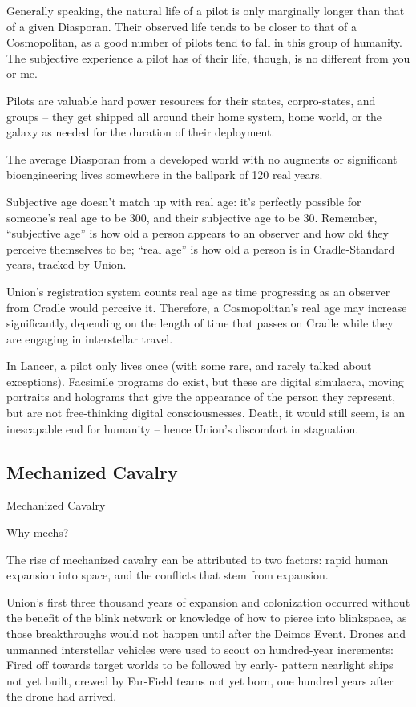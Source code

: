 Generally speaking, the natural life of a pilot is only marginally longer than that of a given
Diasporan. Their observed life tends to be closer to that of a Cosmopolitan, as a good number of
pilots tend to fall in this group of humanity. The subjective experience a pilot has of their life,
though, is no different from you or me.


Pilots are valuable hard power resources for their states, corpro-states, and groups -- they get
shipped all around their home system, home world, or the galaxy as needed for the duration of
their deployment.


The average Diasporan from a developed world with no augments or significant bioengineering
lives somewhere in the ballpark of 120 real years.


Subjective age doesn’t match up with real age: it’s perfectly possible for someone’s real age to
be 300, and their subjective age to be 30. Remember, “subjective age” is how old a person
appears to an observer and how old they perceive themselves to be; “real age” is how old a
person is in Cradle-Standard years, tracked by Union.





Union’s registration system counts real age as time progressing as an observer from Cradle
would perceive it. Therefore, a Cosmopolitan’s real age may increase significantly, depending on
the length of time that passes on Cradle while they are engaging in interstellar travel.


In Lancer, a pilot only lives once (with some rare, and rarely talked about exceptions). Facsimile
programs do exist, but these are digital simulacra, moving portraits and holograms that give the
appearance of the person they represent, but are not free-thinking digital consciousnesses.
Death, it would still seem, is an inescapable end for humanity -- hence Union’s discomfort in
stagnation.

\subsection{Mechanized Cavalry}
Mechanized Cavalry

Why mechs?


The rise of mechanized cavalry can be attributed to two factors: rapid human expansion into
space, and the conflicts that stem from expansion.


Union’s first three thousand years of expansion and colonization occurred without the benefit of
the blink network or knowledge of how to pierce into blinkspace, as those breakthroughs would
not happen until after the Deimos Event. Drones and unmanned interstellar vehicles were used to
scout on hundred-year increments: Fired off towards target worlds to be followed by early-
pattern nearlight ships not yet built, crewed by Far-Field teams not yet born, one hundred years
after the drone had arrived.


